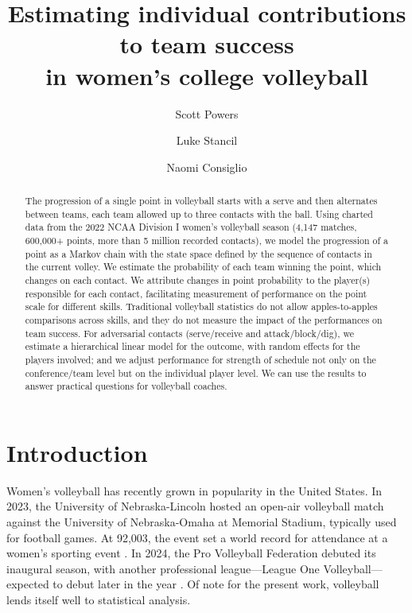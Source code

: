 \documentclass{article}
\title{Estimating individual contributions to team success\\ in women's college volleyball}
\author[1]{Scott Powers}
\author[2]{Luke Stancil}
\author[3]{Naomi Consiglio}
\affil[1]{Department of Sport Management, Rice University}
\affil[2]{Department of Economics, Rice University}
\affil[3]{Department of Statistics, Rice University}
\begin{document}
  \maketitle
	
  \begin{abstract}
    The progression of a single point in volleyball starts with a serve and then alternates between teams, each team allowed up to three contacts with the ball. Using charted data from the 2022 NCAA Division I women's volleyball season (4,147 matches, 600,000+ points, more than 5 million recorded contacts), we model the progression of a point as a Markov chain with the state space defined by the sequence of contacts in the current volley. We estimate the probability of each team winning the point, which changes on each contact. We attribute changes in point probability to the player(s) responsible for each contact, facilitating measurement of performance on the point scale for different skills. Traditional volleyball statistics do not allow apples-to-apples comparisons across skills, and they do not measure the impact of the performances on team success. For adversarial contacts (serve/receive and attack/block/dig), we estimate a hierarchical linear model for the outcome, with random effects for the players involved; and we adjust performance for strength of schedule not only on the conference/team level but on the individual player level. We can use the results to answer practical questions for volleyball coaches.
  \end{abstract}

\section{Introduction}
\label{sec:intro}

Women's volleyball has recently grown in popularity in the United States. In 2023, the University of Nebraska-Lincoln hosted an open-air volleyball match against the University of Nebraska-Omaha at Memorial Stadium, typically used for football games. At 92,003, the event set a world record for attendance at a women's sporting event \citep{olson_2023}. In 2024, the Pro Volleyball Federation debuted its inaugural season, with another professional league---League One Volleyball---expected to debut later in the year \citep{echlin_2024}. Of note for the present work, volleyball lends itself well to statistical analysis.
\end{document}
